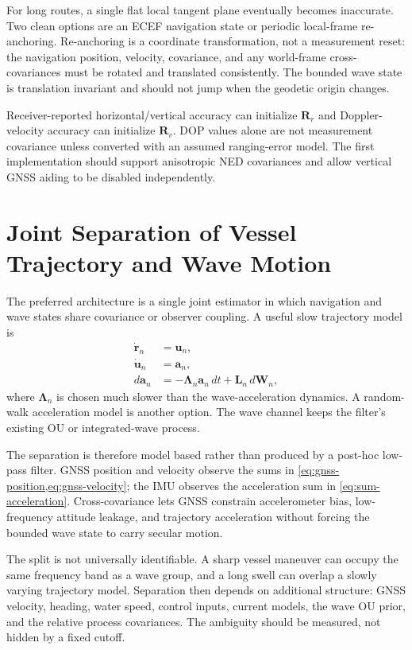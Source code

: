\documentclass[conference]{IEEEtran}
\DeclareRobustCommand{\vct}[1]{\bm{#1}}
\DeclareRobustCommand{\mat}[1]{\bm{#1}}
\begin{document}
For long routes, a single flat local tangent plane eventually becomes inaccurate.
Two clean options are an ECEF navigation state or periodic local-frame re-anchoring.
Re-anchoring is a coordinate transformation, not a measurement reset: the navigation
position, velocity, covariance, and any world-frame cross-covariances must be rotated
and translated consistently.  The bounded wave state is translation invariant and
should not jump when the geodetic origin changes.

Receiver-reported horizontal/vertical accuracy can initialize
$\mat R_r$ and Doppler-velocity accuracy can initialize $\mat R_v$.  DOP values alone
are not measurement covariance unless converted with an assumed ranging-error model.
The first implementation should support anisotropic NED covariances and allow vertical
GNSS aiding to be disabled independently.

\section{Joint Separation of Vessel Trajectory and Wave Motion}
\label{sec:joint-separation}

The preferred architecture is a single joint estimator in which navigation and wave
states share covariance or observer coupling.  A useful slow trajectory model is
\begin{align}
\dot{\vct r}_n &= \vct u_n,\\
\dot{\vct u}_n &= \vct a_n,\\
d\vct a_n &= -\mat\Lambda_n\vct a_n\,dt+\mat L_n\,d\vct W_n,
\label{eq:nav-process}
\end{align}
where $\mat\Lambda_n$ is chosen much slower than the wave-acceleration dynamics.  A
random-walk acceleration model is another option.  The wave channel keeps the filter's
existing OU or integrated-wave process.

The separation is therefore model based rather than produced by a post-hoc low-pass
filter.  GNSS position and velocity observe the sums in
\cref{eq:gnss-position,eq:gnss-velocity}; the IMU observes the acceleration sum in
\cref{eq:sum-acceleration}.  Cross-covariance lets GNSS constrain accelerometer bias,
low-frequency attitude leakage, and trajectory acceleration without forcing the
bounded wave state to carry secular motion.

The split is not universally identifiable.  A sharp vessel maneuver can occupy the
same frequency band as a wave group, and a long swell can overlap a slowly varying
trajectory model.  Separation then depends on additional structure: GNSS velocity,
heading, water speed, control inputs, current models, the wave OU prior, and the
relative process covariances.  The ambiguity should be measured, not hidden by a
fixed cutoff.
\end{document}
